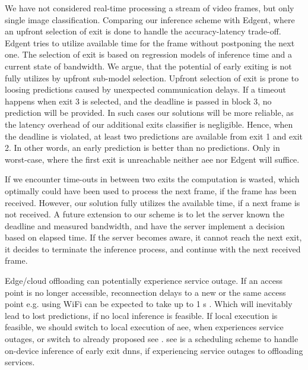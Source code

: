 We have not considered real-time processing a stream of video frames, but only single image classification. Comparing our inference scheme with Edgent, where an upfront selection of exit is done to handle the accuracy-latency trade-off. Edgent tries to utilize available time for the frame without postponing the next one. The selection of exit is based on regression models of inference time and a current state of bandwidth.  We argue, that the potential of early exiting is not fully utilizes by upfront sub-model selection. Upfront selection of exit is prone to loosing predictions caused by unexpected communication delays. If a timeout happens when exit 3 is selected, and the deadline is passed in block 3, no prediction will be provided.  In such cases our solutions will be more reliable, as the latency overhead of our additional exits classifier is negligible. Hence, when the deadline is violated, at least two predictions are available from exit 1 and exit 2. In other words, an early prediction is better than no predictions. Only in worst-case, where the first exit is unreachable neither \gls{aee} nor Edgent will suffice. 

If we encounter time-outs in between two exits the computation is wasted, which optimally could have been used to process the next frame, if the frame has been received. However, our solution fully utilizes the available time, if a next frame is not received. A future extension to our scheme is to let the server known the deadline and measured bandwidth, and have the server implement a decision based on elapsed time. If the server becomes aware, it cannot reach the next exit, it decides to terminate the inference process, and continue with the next received frame.

Edge/cloud offloading can potentially experience service outage. If an access point is no longer accessible, reconnection delays to a new or the same access point e.g. using WiFi can be expected to take up to 1 s \cite{pei_why_2017}. Which will inevitably lead to lost predictions, if no local inference is feasible. If local execution is feasible, we should switch to local execution of \gls{aee}, when experiences service outages, or switch to already proposed \gls{see} \cite{wang_see:_2019}. \gls{see} is a scheduling scheme to handle on-device inference of early exit \gls{dnn}s, if experiencing service outages to offloading services. 
